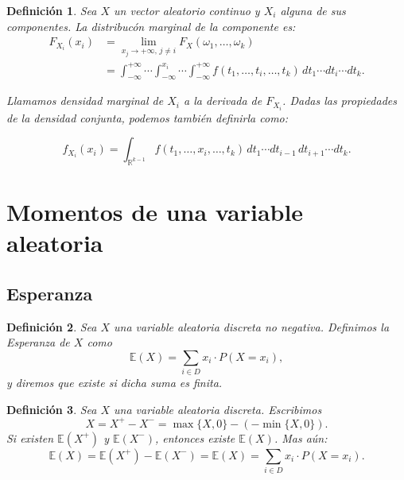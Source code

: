 \documentclass{report}
\newtheorem{dfn}{Definición}[section]
\begin{document}
\begin{dfn}
Sea $X$ un vector aleatorio continuo y $X_i$ alguna de sus componentes. La \emph{distribucón marginal} de la componente es:
\begin{equation*}
    \begin{split}
        F_{X_i}(x_i) & = \lim_{x_j \to +\infty, \, j \neq i} F_X(\omega_1, \dots, \omega_k)\\
        &= \int_{-\infty}^{+\infty} \cdots \int_{-\infty}^{x_i} \cdots \int_{-\infty}^{+\infty}
        f(t_1, \dots, t_i, \dots, t_k) \, dt_1 \cdots dt_i \cdots dt_k.
    \end{split}
\end{equation*}

Llamamos \emph{densidad marginal} de \( X_i \) a la derivada de \( F_{X_i} \). Dadas las propiedades de la densidad conjunta,
podemos también definirla como:

\begin{equation*}
f_{X_i}(x_i) = \int_{\mathbb{R}^{k-1}} f(t_1, \dots, x_i, \dots, t_k) \, dt_1 \cdots dt_{i-1} \, dt_{i+1} \cdots dt_k.
\end{equation*}
\end{dfn}

\section{Momentos de una variable aleatoria}
\subsection{Esperanza}
\begin{dfn}
Sea $X$ una variable aleatoria discreta no negativa. Definimos la \emph{Esperanza} de $X$ como
\begin{equation*}
\mathbb{E}(X) = \sum_{i\in D} x_i \cdot P(X=x_i),
\end{equation*}
y diremos que existe si dicha suma es finita.
\end{dfn}

\begin{dfn}
Sea $X$ una variable aleatoria discreta. Escribimos
\begin{equation*}
    X=X^+ - X^- = \max\{X,0\} - (-\min\{X,0\}).
\end{equation*}
Si existen $\mathbb{E}(X^+)$ y $\mathbb{E}(X^-)$, entonces existe $\mathbb{E}(X)$. Mas aún:
\begin{equation*}
    \mathbb{E}(X) = \mathbb{E}(X^+) - \mathbb{E}(X^-) = \mathbb{E}(X) = \sum_{i\in D} x_i \cdot P(X=x_i).
\end{equation*}
\end{dfn}
\end{document}
